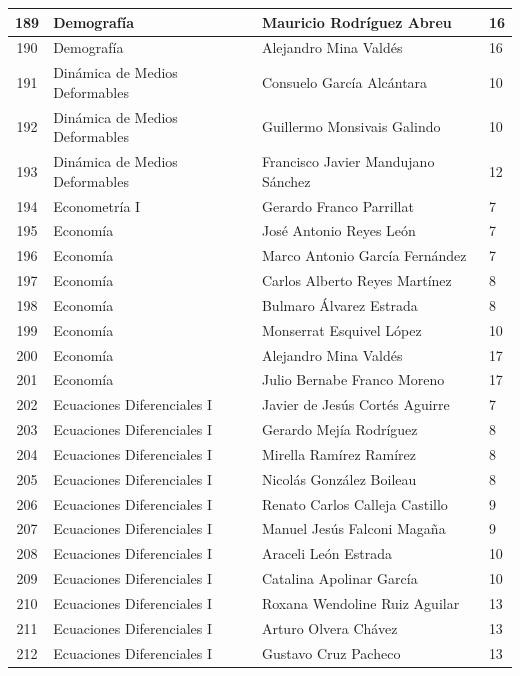 {\begin{longtable}{|c|p{6.5cm}|p{5cm}|p{1.5cm}|}
  189 & Demografía & Mauricio Rodríguez Abreu & 16 \\ \hline
  190 & Demografía & Alejandro Mina Valdés & 16 \\ \hline
  191 & Dinámica de Medios Deformables & Consuelo García Alcántara & 10 \\ \hline
  192 & Dinámica de Medios Deformables & Guillermo Monsivais Galindo & 10 \\ \hline
  193 & Dinámica de Medios Deformables & Francisco Javier Mandujano Sánchez & 12 \\ \hline
  194 & Econometría I & Gerardo Franco Parrillat & 7 \\ \hline
  195 & Economía & José Antonio Reyes León & 7 \\ \hline
  196 & Economía & Marco Antonio García Fernández & 7 \\ \hline
  197 & Economía & Carlos Alberto Reyes Martínez & 8 \\ \hline
  198 & Economía & Bulmaro Álvarez Estrada & 8 \\ \hline
  199 & Economía & Monserrat Esquivel López & 10 \\ \hline
  200 & Economía & Alejandro Mina Valdés & 17 \\ \hline
  201 & Economía & Julio Bernabe Franco Moreno & 17 \\ \hline
  202 & Ecuaciones Diferenciales I & Javier de Jesús Cortés Aguirre & 7 \\ \hline
  203 & Ecuaciones Diferenciales I & Gerardo Mejía Rodríguez & 8 \\ \hline
  204 & Ecuaciones Diferenciales I & Mirella Ramírez Ramírez & 8 \\ \hline
  205 & Ecuaciones Diferenciales I & Nicolás González Boileau & 8 \\ \hline
  206 & Ecuaciones Diferenciales I & Renato Carlos Calleja Castillo & 9 \\ \hline
  207 & Ecuaciones Diferenciales I & Manuel Jesús Falconi Magaña & 9 \\ \hline
  208 & Ecuaciones Diferenciales I & Araceli León Estrada & 10 \\ \hline
  209 & Ecuaciones Diferenciales I & Catalina Apolinar García & 10 \\ \hline
  210 & Ecuaciones Diferenciales I & Roxana Wendoline Ruiz Aguilar & 13 \\ \hline
  211 & Ecuaciones Diferenciales I & Arturo Olvera Chávez & 13 \\ \hline
  212 & Ecuaciones Diferenciales I & Gustavo Cruz Pacheco & 13 \\ \hline

\end{longtable}}
